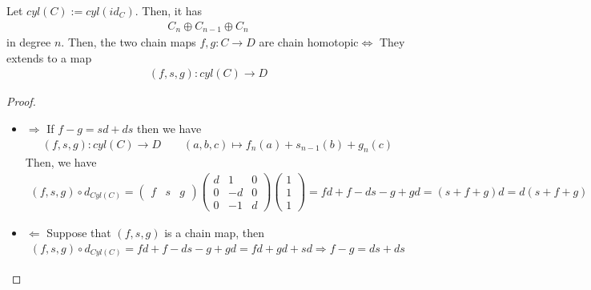 \documentclass[Total.tex]{subfiles}
\begin{document}
			\begin{lemma}
				Let $cyl(C):=cyl(id_C)$. Then, it has 
				\begin{gather*}
					C_n\oplus C_{n-1}\oplus C_n
				\end{gather*}
				in degree $n$. Then, the two chain maps $f,g:C\rightarrow D$ are chain homotopic$\Leftrightarrow$ They extends to a map
				\begin{gather*}
					(f,s,g):cyl(C)\rightarrow D
				\end{gather*}
			\end{lemma}
			\begin{proof}
				\begin{itemize}
					\item $\Rightarrow$ If $f-g=sd+ds$ then we have
					\begin{gather*}
						(f,s,g):cyl(C)\rightarrow D\qquad (a,b,c)\mapsto f_n(a)+s_{n-1}(b)+g_n(c)
					\end{gather*}
					Then, we have
					\begin{gather*}
						(f,s,g)\circ d_{Cyl(C)}=\begin{pmatrix}
							f&s&g
						\end{pmatrix}\begin{pmatrix}
							d&1&0\\
							0&-d&0\\
							0&-1&d
						\end{pmatrix}\begin{pmatrix}
							1\\
							1\\
							1
						\end{pmatrix}=fd+f-ds-g+gd=(s+f+g)d=d(s+f+g)
					\end{gather*}
					\item $\Leftarrow$ Suppose that $(f,s,g)$ is a chain map, then
					\begin{gather*}
						(f,s,g)\circ d_{Cyl(C)}=fd+f-ds-g+gd=fd+gd+sd\Rightarrow f-g=ds+ds
					\end{gather*}
				\end{itemize}
			\end{proof}
			
\end{document}
